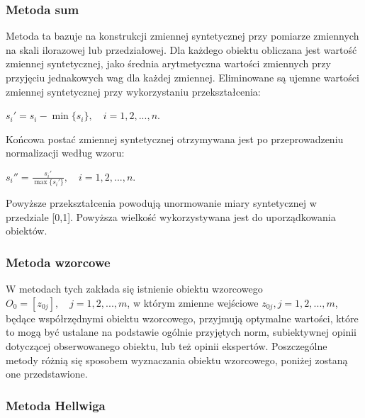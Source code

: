\documentclass[12pt,a4paper]{report}
\begin{document}
\subsubsection{Metoda sum}
\noindent


Metoda ta bazuje na konstrukcji zmiennej syntetycznej przy pomiarze zmiennych na skali ilorazowej lub przedziałowej. Dla każdego obiektu obliczana jest wartość zmiennej syntetycznej, jako średnia arytmetyczna wartości zmiennych przy przyjęciu jednakowych wag dla każdej zmiennej. Eliminowane są ujemne wartości zmiennej syntetycznej przy wykorzystaniu przekształcenia: 
\begin{center}
$s_{i}'=s_{i}-\min\{s_i\}, \quad i=1, 2, ..., n$.\\
\end{center}

Końcowa postać zmiennej syntetycznej otrzymywana jest po przeprowadzeniu normalizacji według wzoru:
\begin{center}
$s_{i}''=\frac{s_{i}'}{\max\{s_{i}'\}},\quad i=1, 2, ..., n$.\\
\end{center}
Powyższe przekształcenia powodują unormowanie miary syntetycznej w przedziale [0,1]. Powyższa wielkość wykorzystywana jest do uporządkowania obiektów.
\newpage

\subsubsection{Metoda wzorcowe}
\noindent

W metodach tych zakłada się istnienie obiektu wzorcowego $O_{0}=[z_{0j}], \quad  j= 1,2,...,m$, w którym zmienne wejściowe $z_{0j},  j= 1,2,...,m$, będące współrzędnymi obiektu wzorcowego, przyjmują optymalne wartości, które to mogą być ustalane na podstawie ogólnie przyjętych norm, subiektywnej opinii dotyczącej obserwowanego obiektu, lub też opinii ekspertów. Poszczególne metody różnią się sposobem wyznaczania obiektu wzorcowego, poniżej zostaną one przedstawione.

\subsubsection{Metoda Hellwiga}
\noindent
\end{document}
